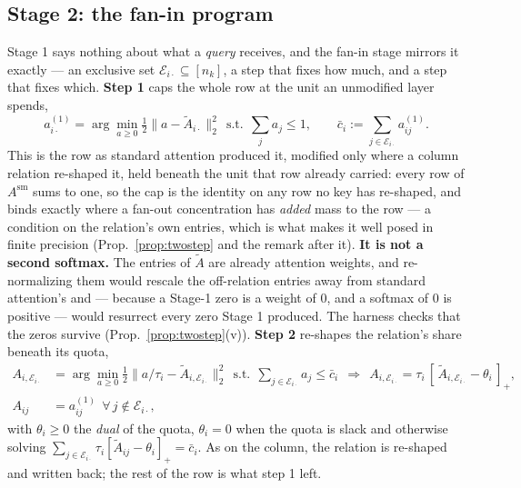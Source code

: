 \documentclass{article}
\begin{document}
\subsection{Stage 2: the fan-in program}
\label{sec:method-fanin}
Stage 1 says nothing about what a \emph{query} receives, and the fan-in stage mirrors it exactly
--- an exclusive set $\mathcal{E}_{i\cdot}\subseteq[n_k]$, a step that fixes how much, and a step
that fixes which. \textbf{Step 1} caps the whole row at the unit an unmodified layer spends,
\begin{equation}
a^{(1)}_{i\cdot} = \arg\min_{a\ge 0}\tfrac12\big\|a-\tilde A_{i\cdot}\big\|_2^2
\ \ \text{s.t.}\ \ \textstyle\sum_j a_j \le 1,
\qquad
\bar c_i := \textstyle\sum_{j\in\mathcal{E}_{i\cdot}} a^{(1)}_{ij}.
\label{eq:rowstep1}
\end{equation}
This is the row as standard attention produced it, modified only where a column relation
re-shaped it, held beneath the unit that row already carried: every row of $A^{\mathrm{sm}}$ sums
to one, so the cap is the identity on any row no key has re-shaped, and binds exactly where a
fan-out concentration has \emph{added} mass to the row --- a condition on the relation's own
entries, which is what makes it well posed in finite precision (Prop.~\ref{prop:twostep} and the
remark after it). \textbf{It is not a second softmax.} The entries of $\tilde A$ are already
attention weights, and re-normalizing them would rescale the off-relation entries away from
standard attention's and --- because a Stage-1 zero is a weight of $0$, and a softmax of $0$ is
positive --- would resurrect every zero Stage 1 produced. The harness checks that the zeros
survive (Prop.~\ref{prop:twostep}(v)). \textbf{Step 2} re-shapes the relation's share beneath its
quota,
\begin{equation}
\begin{aligned}
A_{i,\mathcal{E}_{i\cdot}} &= \arg\min_{a \ge 0} \tfrac12\big\|a/\tau_i - \tilde A_{i,\mathcal{E}_{i\cdot}}\big\|_2^2
\ \ \text{s.t.}\ \ \textstyle\sum_{j\in\mathcal{E}_{i\cdot}} a_j \le \bar c_i
\ \ \Longrightarrow\ \
A_{i,\mathcal{E}_{i\cdot}} = \tau_i\,[\,\tilde A_{i,\mathcal{E}_{i\cdot}} - \theta_i\,]_+ ,\\
A_{ij} &= a^{(1)}_{ij}\ \ \forall\, j\notin\mathcal{E}_{i\cdot},
\end{aligned}
\label{eq:rowprog}
\end{equation}
with $\theta_i\ge0$ the \emph{dual} of the quota, $\theta_i=0$ when the quota is slack and
otherwise solving $\sum_{j\in\mathcal{E}_{i\cdot}}\tau_i[\tilde A_{ij}-\theta_i]_+=\bar c_i$.
As on the column, the relation is re-shaped and written back; the rest of the row is what step 1
left.
\end{document}
